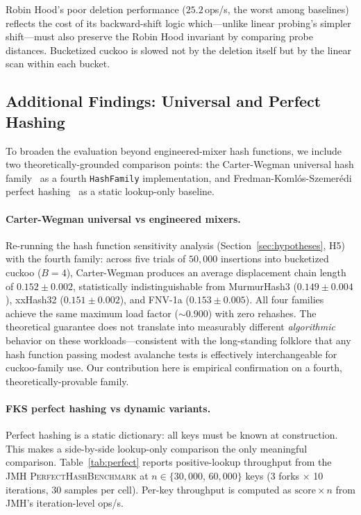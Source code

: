 \documentclass[10pt,journal,compsoc]{IEEEtran}
\begin{document}
Robin Hood's poor deletion performance ($25.2$\,ops/s, the worst among baselines) reflects the cost of its backward-shift logic which---unlike linear probing's simpler shift---must also preserve the Robin Hood invariant by comparing probe distances. Bucketized cuckoo is slowed not by the deletion itself but by the linear scan within each bucket.

\subsection{Additional Findings: Universal and Perfect Hashing}\label{sec:universal-perfect}

To broaden the evaluation beyond engineered-mixer hash functions, we include two theoretically-grounded comparison points: the Carter-Wegman universal hash family~\cite{carter1979universal} as a fourth \texttt{HashFamily} implementation, and Fredman-Kom\-l\'os-Szemer\'edi perfect hashing~\cite{fks1984perfect} as a static lookup-only baseline.

\paragraph{Carter-Wegman universal vs engineered mixers.}
Re-running the hash function sensitivity analysis (Section~\ref{sec:hypotheses}, H5) with the fourth family: across five trials of $50{,}000$ insertions into bucketized cuckoo ($B{=}4$), Carter-Wegman produces an average displacement chain length of $0.152 \pm 0.002$, statistically indistinguishable from MurmurHash3 ($0.149 \pm 0.004$), xxHash32 ($0.151 \pm 0.002$), and FNV-1a ($0.153 \pm 0.005$). All four families achieve the same maximum load factor ($\sim 0.900$) with zero rehashes. The theoretical guarantee does not translate into measurably different \emph{algorithmic} behavior on these workloads---consistent with the long-standing folklore that any hash function passing modest avalanche tests is effectively interchangeable for cuckoo-family use. Our contribution here is empirical confirmation on a fourth, theoretically-provable family.

\paragraph{FKS perfect hashing vs dynamic variants.}
Perfect hashing is a static dictionary: all keys must be known at construction. This makes a side-by-side lookup-only comparison the only meaningful comparison. Table~\ref{tab:perfect} reports positive-lookup throughput from the JMH \textsc{PerfectHashBenchmark} at $n\in\{30{,}000,\,60{,}000\}$ keys (3 forks $\times$ 10 iterations, $30$ samples per cell). Per-key throughput is computed as $\text{score}\times n$ from JMH's iteration-level ops/s.
\end{document}
